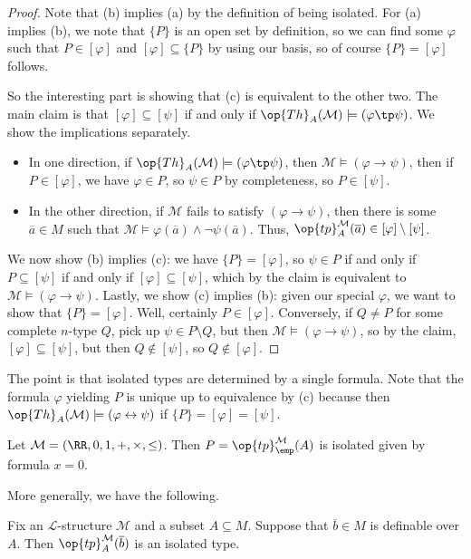 \documentclass[../notes.tex]{subfiles}
\begin{document}
\begin{proof}
	Note that (b) implies (a) by the definition of being isolated. For (a) implies (b), we note that $\{P\}$ is an open set by definition, so we can find some $\varphi$ such that $P\in[\varphi]$ and $[\varphi]\subseteq\{P\}$ by using our basis, so of course $\{P\}=[\varphi]$ follows.

	So the interesting part is showing that (c) is equivalent to the other two. The main claim is that $[\varphi]\subseteq[\psi]$ if and only if $\op{Th}_A(\mathcal M)\models(\varphi\tp\psi)$. We show the implications separately.
	\begin{itemize}
		\item In one direction, if $\op{Th}_A(\mathcal M)\models(\varphi\tp\psi)$, then $\mathcal M\models(\varphi\to\psi)$, then if $P\in[\varphi]$, we have $\varphi\in P$, so $\psi\in P$ by completeness, so $P\in[\psi]$.
		\item In the other direction, if $\mathcal M$ fails to satisfy $(\varphi\to\psi)$, then there is some $\overline a\in M$ such that $\mathcal M\models\varphi(\overline a)\land\lnot\psi(\overline a)$. Thus, $\op{tp}_A^{\mathcal M}(\overline a)\in[\varphi]\setminus[\psi]$.
	\end{itemize}
	We now show (b) implies (c): we have $\{P\}=[\varphi]$, so $\psi\in P$ if and only if $P\subseteq[\psi]$ if and only if $[\varphi]\subseteq[\psi]$, which by the claim is equivalent to $\mathcal M\models(\varphi\to\psi)$. Lastly, we show (c) implies (b): given our special $\varphi$, we want to show that $\{P\}=[\varphi]$. Well, certainly $P\in[\varphi]$. Conversely, if $Q\ne P$ for some complete $n$-type $Q$, pick up $\psi\in P\setminus Q$, but then $\mathcal M\models(\varphi\to\psi)$, so by the claim, $[\varphi]\subseteq[\psi]$, but then $Q\notin[\psi]$, so $Q\notin[\varphi]$.
\end{proof}
\begin{remark}
	The point is that isolated types are determined by a single formula. Note that the formula $\varphi$ yielding $P$ is unique up to equivalence by (c) because then $\op{Th}_A(\mathcal M)\models(\varphi\leftrightarrow\psi)$ if $\{P\}=[\varphi]=[\psi]$.
\end{remark}
\begin{example}
	Let $\mathcal M=(\RR,0,1,+,\times,\le)$. Then $P=\op{tp}_\emp^{\mathcal M}(A)$ is isolated given by formula $x=0$.
\end{example}
More generally, we have the following.
\begin{proposition}
	Fix an $\mathcal L$-structure $\mathcal M$ and a subset $A\subseteq M$. Suppose that $\overline b\in M$ is definable over $A$. Then $\op{tp}_A^{\mathcal M}(\overline b)$ is an isolated type.
\end{proposition}
\end{document}
